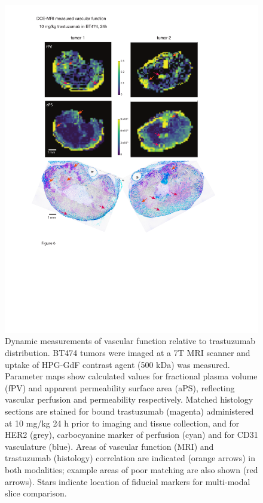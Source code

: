 \begin{figure}[htbp] %
   \centering
   \includegraphics[width=\textwidth]{hpg/hpg-paper2-images/Fig6.pdf} 
   \caption{Dynamic measurements of vascular function relative to trastuzumab distribution. BT474 tumors were imaged at a 7T MRI scanner and uptake of HPG-GdF contrast agent (500 kDa) was measured. 
   Parameter maps show calculated values for fractional plasma volume (fPV) and apparent permeability surface area (aPS), reflecting vascular perfusion and permeability respectively. 
   Matched histology sections are stained for bound trastuzumab (magenta) administered at 10 mg/kg 24 h prior to imaging and tissue collection, and for HER2 (grey), carbocyanine marker of perfusion (cyan) and for CD31 vasculature (blue). 
   Areas of vascular function (MRI) and trastuzumab (histology) correlation are indicated (orange arrows) in both modalities; example areas of poor matching are also shown (red arrows). 
   Stars indicate location of fiducial markers for multi-modal slice comparison.}
   \label{hpgpaper2:fig6}
\end{figure}

